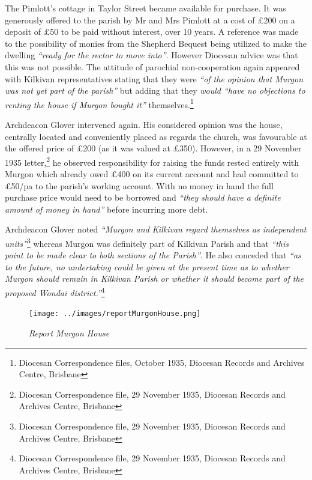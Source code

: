 The Pimlott's cottage in Taylor Street became available for purchase. It was generously offered to the parish by Mr and Mrs Pimlott at a cost of \pounds200 on a deposit of \pounds50 to be paid without interest, over 10 years. A reference was made to the possibility of monies from the Shepherd Bequest being utilized to make the dwelling \emph{``ready for the rector to move into''}. However Diocesan advice was that this was not possible. The attitude of parochial non-cooperation again appeared with Kilkivan representatives stating that they were \emph{``of the opinion that Murgon was not yet part of the parish''} but adding that they \emph{would ``have no objections to renting the house if Murgon bought it''} themselves.\footnote{Diocesan Correspondence files, October 1935, Diocesan Records and Archives Centre, Brisbane}


Archdeacon Glover intervened again. His considered opinion was the house, centrally located and conveniently placed as regards the church, was favourable at the offered price of \pounds200 (as it was valued at \pounds350). However, in a 29 November 1935 letter,\footnote{Diocesan Correspondence file, 29 November 1935, Diocesan Records and Archives Centre, Brisbane} he observed responsibility for raising the funds rested entirely with Murgon which already owed \pounds400 on its current account and had committed to \pounds50/pa to the parish's working account. With no money in hand the full purchase price would need to be borrowed and \emph{``they should have a definite amount of money in hand''} before incurring more debt.


Archdeacon Glover noted \emph{``Murgon and Kilkivan regard themselves as independent units''}\footnote{Diocesan Correspondence file, 29 November 1935, Diocesan Records and Archives Centre, Brisbane} whereas Murgon was definitely part of Kilkivan Parish and that \emph{``this point to be made clear to both sections of the Parish''}. He also conceded that \emph{``as to the future, no undertaking could be given at the present time as to whether Murgon should remain in Kilkivan Parish or whether it should become part of the proposed Wondai district.''}\footnote{Diocesan Correspondence file, 29 November 1935, Diocesan Records and Archives Centre, Brisbane}








\begin{figure}[!htb]
\begin{center}
\texttt{[image: ../images/reportMurgonHouse.png]}
\caption{\itshape Report Murgon House}
\end{center}
\end{figure}




